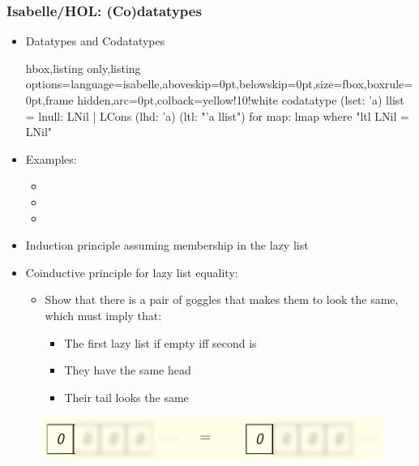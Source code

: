 \documentclass[aspectratio=169,10pt]{beamer}
\begin{document}
\begin{frame}
  \frametitle{Isabelle/HOL: (Co)datatypes}
  \begin{itemize}
    \item Datatypes and Codatatypes
\vspace*{-1ex}
          \begin{tcblisting}{hbox,listing only,listing options={language=isabelle,aboveskip=0pt,belowskip=0pt},size=fbox,boxrule=0pt,frame hidden,arc=0pt,colback=yellow!10!white}
codatatype (lset: 'a) llist = lnull: LNil | LCons (lhd: 'a) (ltl: "'a llist")
  for map: lmap where "ltl LNil = LNil"
          \end{tcblisting}
\vspace*{-1ex}
    \item Examples:
\vspace*{-1ex}
          \begin{itemize}
            \item {}
            \item {}
            \item {}
          \end{itemize}
\vspace*{-1ex}
    \item Induction principle assuming membership in the lazy list
    \item Coinductive principle for lazy list equality:
          \begin{itemize}
            \item Show that there is a pair of goggles that makes them to look the same, which must imply that:
                  \begin{itemize}
                    \item The first lazy list if empty iff second is
                    \item They have the same head
                    \item Their tail looks the same
                  \end{itemize}
          \end{itemize}
  \end{itemize}
\vspace*{-1ex}
  \begin{figure}
    \centering
    \includegraphics[scale=0.4]{equality_2.png}
  \end{figure}
\end{frame}
\end{document}
